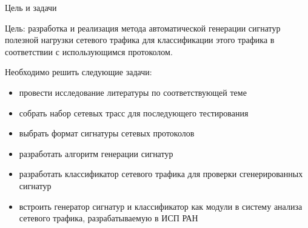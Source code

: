 \documentclass[10pt]{beamer}
\begin{document}
\begin{frame}{Цель и задачи}
    \begin{block}{Цель:}
        разработка и реализация метода автоматической
        генерации сигнатур полезной нагрузки сетевого трафика для классификации этого трафика
        в соответствии с использующимся протоколом.
    \end{block}

    \begin{block}{Необходимо решить следующие задачи:}
        \begin{itemize}
            \item провести исследование литературы по соответствующей теме
            \item собрать набор сетевых трасс для последующего тестирования
            \item выбрать формат сигнатуры сетевых протоколов
            \item разработать алгоритм генерации сигнатур
            \item разработать классификатор сетевого трафика для проверки сгенерированных сигнатур
            \item встроить генератор сигнатур и классификатор как модули в систему анализа сетевого трафика, разрабатываемую в ИСП РАН
        \end{itemize}
    \end{block}

\end{frame}
\end{document}

